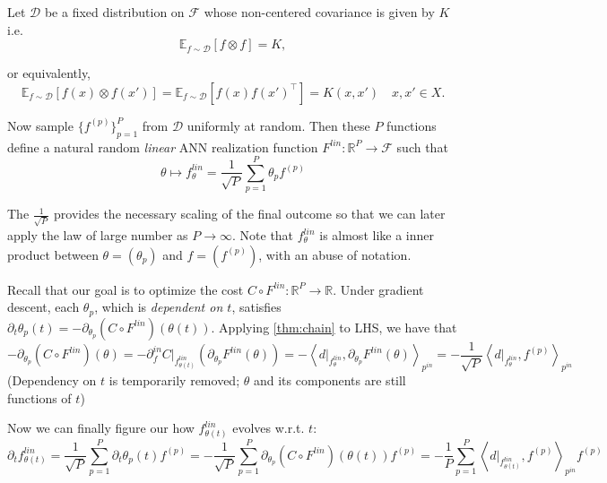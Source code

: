 \documentclass{article}
\theoremstyle{plain}
\theoremstyle{definition}
\theoremstyle{remark}
\begin{document}
Let $\mathcal{D}$ be a fixed distribution on $\mathcal{F}$ whose non-centered covariance is given by $K$ i.e.
\begin{equation}
	\mathbb{E}_{f \sim \mathcal{D}} \left[ f \otimes f \right] 
	= K,
\end{equation}

or equivalently,
\begin{equation}
	\mathbb{E}_{f \sim \mathcal{D}} \left[ f(x) \otimes f(x') \right] 
	= \mathbb{E}_{f \sim \mathcal{D}} \left[ f(x) f(x')^\intercal \right] 
	= K(x, x') \quad x, x' \in X.
\end{equation}

Now sample $\{f^{(p)}\}_{p=1}^P$ from $\mathcal{D}$ uniformly at random.
Then these $P$ functions define a natural random {\it linear} ANN realization function $F^{lin}: \mathbb{R}^P \rightarrow \mathcal{F}$ such that
\begin{equation}
	\theta \mapsto f_\theta^{lin} = \frac{1}{\sqrt{P}} \sum_{p=1}^P \theta_p f^{(p)}
\end{equation}

The $\frac{1}{\sqrt{P}}$ provides the necessary scaling of the final outcome so that we can later apply the law of large number as $P \rightarrow \infty$.
Note that $f_\theta^{lin}$ is almost like a inner product between $\theta = (\theta_p)$ and $f = (f^{(p)})$, with an abuse of notation.

Recall that our goal is to optimize the cost $C \circ F^{lin} : \mathbb{R}^P \rightarrow \mathbb{R}$.
Under gradient descent, each $\theta_p$, which is {\it dependent on $t$}, satisfies $\partial_t \theta_p(t) = -\partial_{\theta_p} (C \circ F^{lin})(\theta(t))$.
Applying \ref{thm:chain} to LHS, we have that
\begin{equation}
	-\partial_{\theta_p} (C \circ F^{lin})(\theta) 
	= - \partial_f^{in} C \rvert_{f_{\theta(t)}^{lin}} \left( \partial_{\theta_p} F^{lin}(\theta) \right)
	= - \left\langle d\rvert_{f_{\theta}^{lin}}, \partial_{\theta_p} F^{lin}(\theta) \right\rangle_{p^{in}}
	= - \frac{1}{\sqrt{P}} \left\langle d\rvert_{f_{\theta}^{lin}}, f^{(p)} \right\rangle_{p^{in}}
\end{equation}
(Dependency on $t$ is temporarily removed; $\theta$ and its components are still functions of $t$)

Now we can finally figure our how $f_{\theta(t)}^{lin}$ evolves w.r.t. $t$:
\begin{equation}
\label{eq:evolve}
	\partial_t f_{\theta(t)}^{lin} = \frac{1}{\sqrt{P}} \sum_{p=1}^P \partial_t \theta_p(t) f^{(p)}
	= - \frac{1}{\sqrt{P}} \sum_{p=1}^P \partial_{\theta_p} (C \circ F^{lin})(\theta(t)) f^{(p)}
	= - \frac{1}{P} \sum_{p=1}^P \left\langle d\rvert_{f_{\theta(t)}^{lin}} , f^{(p)} \right\rangle_{p^{in}} f^{(p)}
\end{equation}
\end{document}
